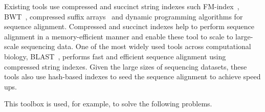 \begin{itemize}[leftmargin=*]
Existing tools use compressed and succinct string indexes such FM-index~\cite{ferragina2000opportunistic}, BWT~\cite{burrows1994block}, compressed suffix arrays~\cite{grossi2000compressed} and dynamic programming algorithms for sequence alignment.
Compressed and succinct indexes help to perform sequence alignment in a memory-efficient manner and enable these tool to scale to large-scale sequencing data.
One of the most widely used tools across computational biology, BLAST~\cite{altschul1990basic}, performs fast and efficient sequence alignment using compressed string indexes.
Given the large sizes of sequencing datasets, these tools also use hash-based \kmer indexes to seed the sequence alignment to achieve speed ups.


\end{itemize}

This toolbox is used, for example, to solve the following problems.

